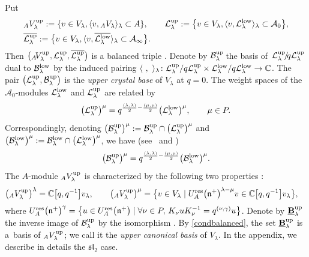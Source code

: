 \documentclass[pdftex]{sigma}
\numberwithin{equation}{section}
\theoremstyle{definition}
\newcommand{\mc}{\mathbb{C}}
\newcommand{\Ll}{{\mathcal L}}
\newcommand{\ra}{\rightarrow}
\begin{document}
Put
\begin{align}
& {}_AV_\lambda^{\rm up} := \{v\in V_\lambda, \langle v,{}_AV_\lambda\rangle_\lambda\subset A\},\qquad
\Ll_{\lambda}^{\rm up} := \big\{v\in V_\lambda, \langle v,\Ll_{\lambda}^{\rm low}\rangle_\lambda\subset \mathcal{A}_0\big\},\nonumber\\
&\overline{\Ll_{\lambda}^{\rm up}} := \big\{v\in V_\lambda, \langle v,\overline{\Ll_{\lambda}^{\rm low}}\rangle_\lambda\subset \mathcal{A}_\infty\big\}.\label{upmodule}
\end{align}
Then $\big({}_A\!V_\lambda^{\rm up},\Ll_{\lambda}^{\rm up},\overline{\Ll_{\lambda}^{\rm up}}\big)$ is a balanced triple \cite[Lemma 4.2.1]{Kashiwara2}. Denote by $\mathcal{B}_\lambda^{\rm up}\!$ the basis of~${\Ll_{\lambda}^{\rm up}\!/\!q\Ll_{\lambda}^{\rm up}}$ dual to $\mathcal{B}_\lambda^{\rm low}$ by the induced pairing $\langle\ ,\ \rangle_\lambda\colon \Ll_{\lambda}^{\rm up}/q\Ll_{\lambda}^{\rm up} \times \Ll_{\lambda}^{\rm low}/q\Ll_{\lambda}^{\rm low} \ra \mc$. The pair $\big(\Ll_{\lambda}^{\rm up},\mathcal{B}_\lambda^{\rm up}\big)$ is the {\it upper crystal base} of $V_\lambda$ at $q=0$. The weight spaces of the $\mathcal{A}_0$-modules $\Ll_{\lambda}^{\rm low}$ and $\Ll_{\lambda}^{\rm up}$ are related by
\begin{equation}\label{renormweightA} \big(\Ll_{\lambda}^{\rm up}\big)^\mu = q^{\frac{(\lambda,\lambda)}{2} - \frac{(\mu,\mu)}{2}} \big(\Ll_{\lambda}^{\rm low}\big)^\mu , \qquad \mu\in P. \end{equation}
Correspondingly, denoting $\big(\mathcal{B}_\lambda^{\rm up}\big)^\mu := \mathcal{B}_\lambda^{\rm up} \cap \big(\Ll_\lambda^{\rm up}\big)^\mu$ and $\big(\mathcal{B}_\lambda^{\rm low}\big)^\mu := \mathcal{B}_\lambda^{\rm low} \cap \big(\Ll_\lambda^{\rm low}\big)^\mu$, we have (see~\cite{Kashiwara1} and \cite[equation~(4.2.9)]{Kashiwara2})
\[\big(\mathcal{B}_\lambda^{\rm up}\big)^\mu = q^{\frac{(\lambda,\lambda)}{2} - \frac{(\mu,\mu)}{2}} \big(\mathcal{B}_\lambda^{\rm low}\big)^\mu.\]
The $A$-module ${}_AV_\lambda^{\rm up}$ is characterized by the following two properties \cite[equations~(4.2.10)--(4.2.12)]{Kashiwara2}:
\begin{align*}
\big({}_AV_\lambda^{\rm up}\big)^\lambda & = \mc\big[q,q^{-1}\big]v_\lambda,\qquad
\big({}_AV_\lambda^{\rm up}\big)^\mu = \bigl\{v\in V_\lambda \mid U_A^{\rm res}\big(\mathfrak{n}^+\big)^{\lambda-\mu} v \in \mc\big[q,q^{-1}\big]v_\lambda\bigr\},
\end{align*}
where $U_A^{\rm res}\big(\mathfrak{n}^+\big)^{\gamma} = \big\{u\in U_A^{\rm res}\big(\mathfrak{n}^+\big) \mid \forall \nu\in P, \, K_\nu uK_\nu^{-1} = q^{(\nu,\gamma)}u\big\}$. Denote by $\underline{\mathbf{B}}_\lambda^{\rm up}$ the inverse image of $\mathcal{B}_\lambda^{\rm up}$ by the isomorphism \smash{${}_AV_\lambda^{\rm up}\cap \Ll_{\lambda}^{\rm up}\cap \overline{\Ll_{\lambda}^{\rm up}} \ra \Ll_{\lambda}^{\rm up}/q\Ll_{\lambda}^{\rm up}$}. By \eqref{condbalanced}, the set $\underline{\mathbf{B}}_\lambda^{\rm up}$ is a~basis of ${}_AV_\lambda^{\rm up}$; we call it the {\it upper canonical basis} of $V_\lambda$. In the appendix, we describe in details the ${\mathfrak{sl}_2}$ case.
\end{document}
